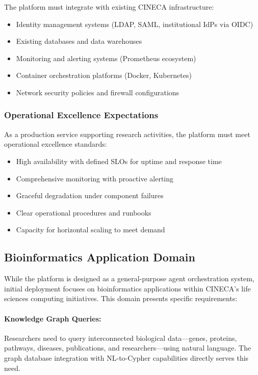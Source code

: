 The platform must integrate with existing CINECA infrastructure:

\begin{itemize}
    \item Identity management systems (LDAP, SAML, institutional IdPs via OIDC)
    \item Existing databases and data warehouses
    \item Monitoring and alerting systems (Prometheus ecosystem)
    \item Container orchestration platforms (Docker, Kubernetes)
    \item Network security policies and firewall configurations
\end{itemize}

\subsubsection{Operational Excellence Expectations}

As a production service supporting research activities, the platform must meet operational excellence standards:

\begin{itemize}
    \item High availability with defined SLOs for uptime and response time
    \item Comprehensive monitoring with proactive alerting
    \item Graceful degradation under component failures
    \item Clear operational procedures and runbooks
    \item Capacity for horizontal scaling to meet demand
\end{itemize}

\subsection{Bioinformatics Application Domain}

While the platform is designed as a general-purpose agent orchestration system, initial deployment focuses on bioinformatics applications within CINECA's life sciences computing initiatives. This domain presents specific requirements:

\paragraph{Knowledge Graph Queries:}
Researchers need to query interconnected biological data---genes, proteins, pathways, diseases, publications, and researchers---using natural language. The graph database integration with NL-to-Cypher capabilities directly serves this need.


